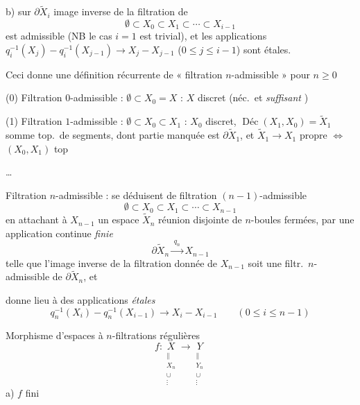 \documentclass[11pt,a4paper]{article}
\begin{document}
b)   sur
$\partial\widetilde{X}_i$ image inverse de la filtration de
\[
  \emptyset \subset X_0 \subset X_1 \subset \cdots \subset X_{i-1}
\]
est admissible (NB le cas $i = 1$ est trivial), et les
applications $q_i^{-1}(X_j) - q_i^{-1}(X_{j-1}) \to X_j - X_{j-1}$ ($0
\leqslant j \leqslant i-1$) sont étales.

Ceci donne une définition récurrente de « filtration $n$-admissible »
pour $n \geqslant 0$

(0) Filtration $0$-admissible : $\emptyset \subset X_0 = X$ : $X$ discret
(néc.\ et \emph{suffisant} )

(1) Filtration $1$-admissible : $\emptyset \subset X_0 \subset X_1$ :
$X_0$ discret, $\operatorname{Déc}(X_1, X_0) = \widetilde{X}_1$ somme top.\
de segments, dont partie manquée est $\partial\widetilde{X}_1$, et
$\widetilde{X}_1 \to X_1$ propre $\Leftrightarrow$ $(X_0, X_1)$
 top

…

Filtration $n$-admissible : se déduisent de filtration $(n-1)$-admissible
\[
  \emptyset \subset X_0 \subset X_1 \subset \cdots \subset X_{n-1}
\]
en attachant à $X_{n-1}$ un espace $\widetilde{X}_n$ réunion disjointe de
$n$-boules fermées, par une application continue \emph{finie}
\[
  \partial\widetilde{X}_n \xrightarrow{\;q_n\;} X_{n-1}
\]
telle que l'image inverse de la filtration donnée de $X_{n-1}$ soit une
filtr.\ $n$-admissible de $\partial\widetilde{X}_n$, et

donne lieu à des applications \emph{étales}
\[
  q_n^{-1}(X_i) - q_n^{-1}(X_{i-1}) \longrightarrow X_i - X_{i-1} \qquad (0
  \leqslant i \leqslant n-1)
\]

Morphisme d'espaces à $n$-filtrations régulières
\[
  f : \underset{\substack{\| \\ X_n \\ \cup \\ \vdots}}{X} \longrightarrow
  \underset{\substack{\| \\ Y_n \\ \cup \\ \vdots}}{Y}
\]
a) $f$ fini
\end{document}
